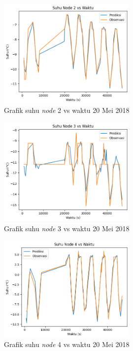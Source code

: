 \begin{figure}[H]
\setlength{}
\begin{center}
\includegraphics[width=0.6\textwidth]{fig/node2_temp_2018-05-20.png}
\caption{Grafik suhu \textit{node} 2 vs waktu 20 Mei 2018}
\label{fig:node220}
\end{center}
\end{figure}

\begin{figure}[H]
\setlength{}
\begin{center}
\includegraphics[width=0.6\textwidth]{fig/node3_temp_2018-05-20.png}
\caption{Grafik suhu \textit{node} 3 vs waktu 20 Mei 2018}
\label{fig:node320}
\end{center}
\end{figure}

\begin{figure}[H]
\setlength{}
\begin{center}
\includegraphics[width=0.6\textwidth]{fig/node4_temp_2018-05-20.png}
\caption{Grafik suhu \textit{node} 4 vs waktu 20 Mei 2018}
\label{fig:node420}
\end{center}
\end{figure}


